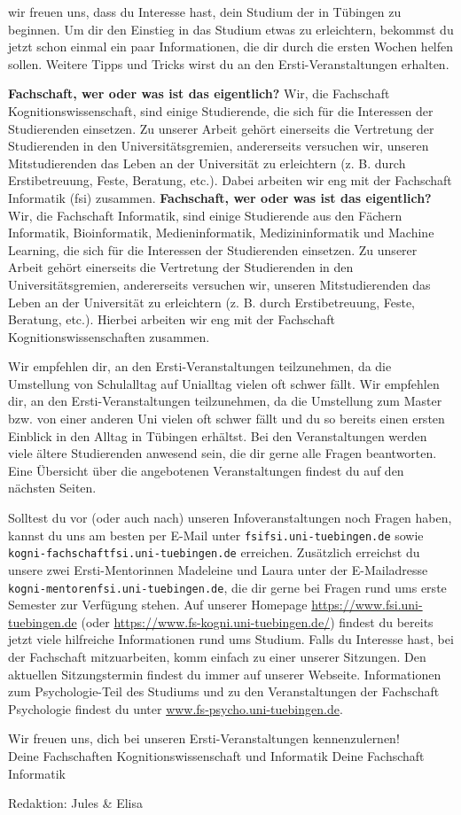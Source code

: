 \thispagestyle{firststyle}
wir freuen uns, dass du Interesse hast, dein Studium der \studiengang in Tübingen zu beginnen.
Um dir den Einstieg in das Studium etwas zu erleichtern, bekommst du jetzt schon einmal
ein paar Informationen, die dir durch die ersten Wochen helfen sollen.
Weitere Tipps und Tricks wirst du an den Ersti-Veranstaltungen erhalten.


\ifkogwiss
\textbf{\glqq Fachschaft\grqq, wer oder was ist das eigentlich?} Wir, die Fachschaft Kognitionswissenschaft, sind einige Studierende, die sich für die Interessen der Studierenden einsetzen. Zu unserer Arbeit
gehört einerseits die Vertretung der Studierenden in den Universitätsgremien, andererseits versuchen wir, unseren
Mitstudierenden das Leben an der Universität zu erleichtern (z. B. durch Erstibetreuung, Feste,
Beratung, etc.). Dabei arbeiten wir eng mit der Fachschaft Informatik (fsi) zusammen.
\else
\textbf{\glqq Fachschaft\grqq, wer oder was ist das eigentlich?} Wir, die Fachschaft Informatik, sind einige Studierende aus den Fächern
Informatik, Bioinformatik, Medieninformatik, Medizininformatik und Machine Learning, die sich für die Interessen der Studierenden einsetzen. Zu unserer Arbeit
gehört einerseits die Vertretung der Studierenden in den Universitätsgremien, andererseits versuchen wir, unseren
Mitstudierenden das Leben an der Universität zu erleichtern (z. B. durch Erstibetreuung, Feste, Beratung, etc.). Hierbei arbeiten wir eng mit der Fachschaft Kognitionswissenschaften zusammen.
\fi

\ifbachelor 
Wir empfehlen dir, an den Ersti-Veranstaltungen teilzunehmen, da die Umstellung von Schulalltag
auf Unialltag vielen oft schwer fällt. 
\fi
\ifmaster
Wir empfehlen dir, an den Ersti-Veranstaltungen teilzunehmen, da die Umstellung zum Master bzw. von einer anderen Uni vielen oft schwer fällt und du so bereits einen ersten Einblick in den Alltag in Tübingen erhältst.
\fi 
Bei den Veranstaltungen werden viele ältere Studierenden
anwesend sein, die dir gerne alle Fragen beantworten. Eine Übersicht über die angebotenen
Veranstaltungen findest du auf den nächsten Seiten.

Solltest du vor (oder auch nach) unseren Infoveranstaltungen noch Fragen haben, kannst du uns
am besten per E-Mail unter \texttt{fsi\At fsi.uni-tuebingen.de}
\ifkogwiss
sowie \texttt{kogni-fachschaft\At fsi.uni-tuebingen.de}
\fi
erreichen.
\ifkogwiss
Zusätzlich erreichst du unsere zwei Ersti-Mentorinnen Madeleine und Laura unter der E-Mailadresse \texttt{kogni-mentoren\At fsi.uni-tuebingen.de}, die dir gerne bei Fragen rund ums erste Semester zur Verfügung stehen.
\fi
Auf unserer Homepage \mbox{\url{https://www.fsi.uni-tuebingen.de}} (oder \mbox{\url{https://www.fs-kogni.uni-tuebingen.de/}}) findest du bereits
jetzt viele hilfreiche Informationen rund ums Studium. Falls du Interesse hast, bei der Fachschaft mitzuarbeiten,
komm einfach zu einer unserer Sitzungen. Den aktuellen Sitzungstermin findest du immer auf unserer Webseite.
\ifkogwiss  Informationen zum Psychologie-Teil des Studiums und zu den Veranstaltungen der
Fachschaft Psychologie findest du unter \url{www.fs-psycho.uni-tuebingen.de}.\fi

Wir freuen uns, dich bei unseren Ersti-Veranstaltungen kennenzulernen!\\
\ifkogwiss
Deine Fachschaften Kognitionswissenschaft und Informatik
\else
Deine Fachschaft Informatik
\hfill
{\footnotesize Redaktion: Jules \& Elisa\par}
\fi
\vfill
